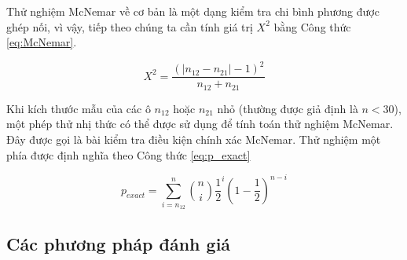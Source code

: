 \documentclass[../the.tex]{subfiles}
\begin{document}
Thử nghiệm McNemar về cơ bản là một dạng kiểm tra chi bình phương được ghép nối, vì vậy, tiếp theo chúng ta cần tính giá trị $X^2$ bằng Công thức \ref{eq:McNemar}.

\begin{equation}
	X^2 = \frac{(|n_{12} - n_{21}| - 1)^2}{n_{12} + n_{21}}
	\label{eq:McNemar}
\end{equation}

Khi kích thước mẫu của các ô $n_{12}$ hoặc $n_{21}$ nhỏ (thường được giả định là $n < 30$), một phép thử nhị thức có thể được sử dụng để tính toán thử nghiệm McNemar. Đây được gọi là bài kiểm tra điều kiện chính xác McNemar. Thử nghiệm một phía được định nghĩa theo Công thức \ref{eq:p_exact}

\begin{equation}
	p_{exact} = \sum_{i=n_{12}}^{n} \binom{n}{i} \frac{1}{2}^i (1 - \frac{1}{2})^{n-i}
	\label{eq:p_exact}
\end{equation}

\subsection{Các phương pháp đánh giá}
\end{document}
